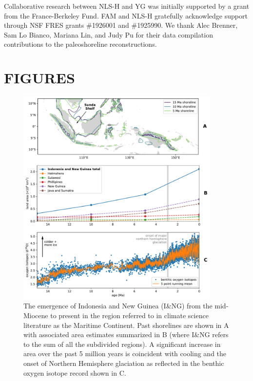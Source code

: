 \documentclass[11pt,letterpaper]{article}
\begin{document}
Collaborative research between NLS-H and YG was initially supported by a grant from the France-Berkeley Fund. FAM and NLS-H gratefully acknowledge support through NSF FRES grants \#1926001 and \#1925990. We thank Alec Brenner, Sam Lo Bianco, Mariana Lin, and Judy Pu for their data compilation contributions to the paleoshoreline reconstructions. 

\clearpage
\newpage

\section*{FIGURES}

\begin{figure}[h!]
    \centering
    \includegraphics[width=0.9\textwidth]{Figures/shoreline_growth.pdf}
    \caption{The emergence of Indonesia and New Guinea (I\&NG) from the mid-Miocene to present in the region referred to in climate science literature as the Maritime Continent. Past shorelines are shown in A with associated area estimates summarized in B (where I\&NG refers to the sum of all the subdivided regions). A significant increase in area over the past 5 million years is coincident with cooling and the onset of Northern Hemisphere glaciation as reflected in the benthic oxygen isotope record \cite{Zachos2008a} shown in C.}
    \label{fig:shoreline_growth}
\end{figure}
\end{document}
